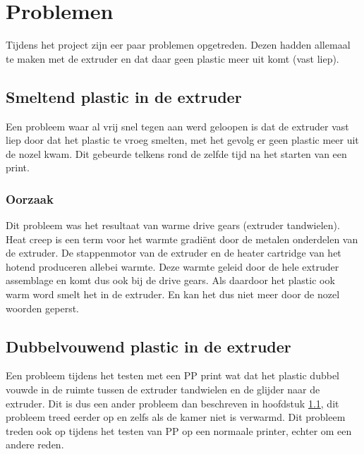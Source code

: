\chapter{Problemen}
\label{Problemen}

Tijdens het project zijn eer paar problemen opgetreden. Dezen hadden allemaal
te maken met de extruder en dat daar geen plastic meer uit komt (vast liep).

\section{Smeltend plastic in de extruder}
\label{s:smeltendplastic}

Een probleem waar al vrij snel tegen aan werd geloopen is dat de extruder vast
liep door dat het plastic te vroeg smelten, met het gevolg er geen plastic meer uit de nozel kwam.
Dit gebeurde telkens rond de zelfde tijd na het starten van een print.

\subsection{Oorzaak}

Dit probleem was het resultaat van warme drive gears (extruder tandwielen).
Heat creep is een term voor het warmte gradiënt door de metalen onderdelen van
de extruder. De stappenmotor van de extruder en de heater cartridge van het
hotend produceren allebei warmte. Deze warmte geleid door de hele extruder
assemblage en komt dus ook bij de drive gears. Als daardoor het plastic ook
warm word smelt het in de extruder. En kan het dus niet meer door de nozel
woorden geperst.

\section{Dubbelvouwend plastic in de extruder}
\label{s:Dubbelvouwend}

Een probleem tijdens het testen met een PP print wat dat het plastic dubbel
vouwde in de ruimte tussen de extruder tandwielen en de glijder naar de
extruder. Dit is dus een ander probleem dan beschreven in hoofdstuk
\ref{s:smeltendplastic}, dit probleem treed eerder op en zelfs als de kamer
niet is verwarmd. Dit probleem treden ook op tijdens het testen van PP op een
normaale printer, echter om een andere reden.

